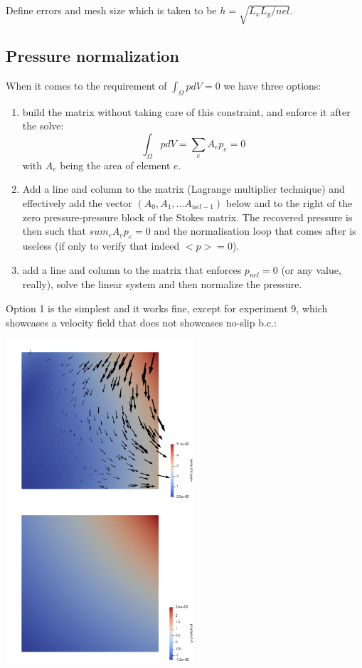 Define errors and mesh size which is taken to be $h = \sqrt{L_xL_y/nel}$. 


\subsection*{Pressure normalization}

When it comes to the requirement of $\int_\Omega p dV=0$ we have three options:
\begin{enumerate}
\item build the matrix without taking care of this constraint, and 
enforce it after the solve:
\[
\int_\Omega p dV = \sum_e A_e p_e = 0
\]
with $A_e$ being the area of element $e$.

\item Add a line and column to the matrix (Lagrange multiplier technique)
and effectively add the vector $(A_0, A_1, ... A_{nel-1})$ below and to the 
right of the zero pressure-pressure block of the Stokes matrix. 
The recovered pressure is then such that $sum_e A_e p_e = 0$
and the normalisation loop that comes after is useless (if only to 
verify that indeed $<p>=0$).

\item add a line and column to the matrix that enforces $p_{nel}=0$
(or any value, really), solve the linear system and then 
normalize the pressure.

\end{enumerate}

Option 1 is the simplest and it works fine, except for 
experiment 9, which showcases a velocity field that 
does not showcases no-slip b.c.:

\begin{center}
\includegraphics[width=7cm]{./results/exp09/vel.png}
\includegraphics[width=7cm]{./results/exp09/press.png}
\end{center}

